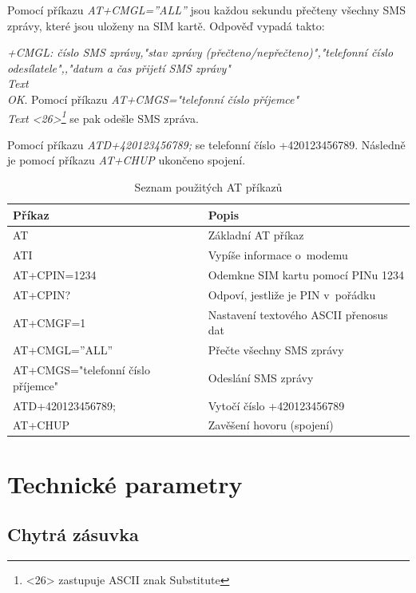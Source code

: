 \documentclass[12pt,a4paper,oneside]{article}
\begin{document}
Pomocí příkazu \textit{AT+CMGL=”ALL”} jsou každou sekundu přečteny všechny SMS zprávy, které jsou uloženy na SIM kartě. Odpověď vypadá takto:

\textit{+CMGL: číslo SMS zprávy,"stav zprávy (přečteno/nepřečteno)","telefonní číslo odesílatele",,"datum a čas přijetí SMS zprávy" \\ Text \\ OK}.
Pomocí příkazu \textit{AT+CMGS="telefonní číslo příjemce" \\ Text <26>\footnote{<26> zastupuje ASCII znak Substitute}} se pak odešle SMS zpráva.

Pomocí příkazu \textit{ATD+420123456789;} se  telefonní číslo +420123456789. Následně je pomocí příkazu \textit{AT+CHUP} ukončeno spojení.

\begin{table}[H]
	\centering
	\begin{tabular}{|l|l|}
		\hline
		\textbf{Příkaz} & \textbf{Popis} \\
		\hline
		\hline
		AT & Základní AT příkaz \\
		\hline
		ATI & Vypíše informace o~modemu \\
		\hline
		AT+CPIN=1234 & Odemkne SIM kartu pomocí PINu 1234 \\
		\hline
		AT+CPIN? & Odpoví, jestliže je PIN v~pořádku \\
		\hline
		AT+CMGF=1 & Nastavení textového ASCII přenosus dat \\
		\hline
		AT+CMGL=”ALL” & Přečte všechny SMS zprávy \\
		\hline
		AT+CMGS="telefonní číslo příjemce" & Odeslání SMS zprávy \\
		\hline
		ATD+420123456789; & Vytočí číslo +420123456789 \\
		\hline
		AT+CHUP & Zavěšení hovoru (spojení) \\
		\hline
	\end{tabular}
	\caption{Seznam použitých AT příkazů}\label{table:at-prikazy}
\end{table}

\newpage

\section{Technické parametry}

\subsection{Chytrá zásuvka}
\end{document}
